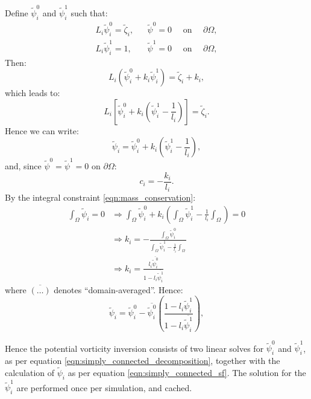 \documentclass[a4paper]{book}
\begin{document}
Define $\tilde{\psi}^0_i$ and $\tilde{\psi}^1_i$ such that:
\begin{align}\label{eqn:simply_connected_decomposition}
  L_i \tilde{\psi}^0_i = \tilde{\zeta}_i, & & \tilde{\psi}^0 = 0 \quad \textrm{ on } \quad \partial \Omega, \nonumber \\
  L_i \tilde{\psi}^1_i = 1,               & & \tilde{\psi}^1 = 0 \quad \textrm{ on } \quad \partial \Omega,
\end{align}
Then:
\begin{equation}
  L_i \left( \tilde{\psi}^0_i + k_i \tilde{\psi}^1_i \right) = \tilde{\zeta}_i + k_i,
\end{equation}
which leads to:
\begin{equation}
  L_i \left[ \tilde{\psi}^0_i + k_i \left( \tilde{\psi}^1_i - \frac{1}{l_i} \right) \right] = \tilde{\zeta}_i.
\end{equation}
Hence we can write:
\begin{equation}
  \tilde{\psi}_i = \tilde{\psi}^0_i + k_i \left( \tilde{\psi}^1_i - \frac{1}{l_i} \right),
\end{equation}
and, since $\tilde{\psi}^0 = \tilde{\psi}^1 = 0$ on $\partial \Omega$:
\begin{equation}
  c_i = - \frac{k_i}{l_i}.
\end{equation}
By the integral constraint \eqref{eqn:mass_conservation}:
\begin{align}
  \int_\Omega \tilde{\psi}_i = 0 & \Rightarrow \int_\Omega \tilde{\psi}^0_i + k_i \left( \int_\Omega \tilde{\psi}^1_i - \frac{1}{l_i} \int_\Omega \right) = 0 \nonumber \\
                                & \Rightarrow k_i = - \frac{\int_\Omega \tilde{\psi}^0_i}{\int_\Omega \tilde{\psi}^1_i - \frac{1}{l_i} \int_\Omega} \nonumber \\
                                & \Rightarrow k_i = \frac{l_i \overline{\tilde{\psi}^0_i}}{1 - l_i \overline{\tilde{\psi}^1_i}}
\end{align}
where $\overline{\left( \ldots \right)}$ denotes ``domain-averaged''. Hence:
\begin{equation}\label{eqn:simply_connected_sf}
  \tilde{\psi}_i = \tilde{\psi}^0_i - \overline{\tilde{\psi}^0_i} \left( \frac{1 - l_i \tilde{\psi}^1_i}{1 - l_i \overline{\tilde{\psi}^1_i}} \right),
\end{equation}

Hence the potential vorticity inversion consists of two linear solves for
$\tilde{\psi}^0_i$ and $\tilde{\psi}^1_i$, as per equation
\eqref{eqn:simply_connected_decomposition}, together with the calculation of
$\tilde{\psi}_i$ as per equation \eqref{eqn:simply_connected_sf}. The solution
for the $\tilde{\psi}^1_i$ are performed once per simulation, and cached.
\end{document}
